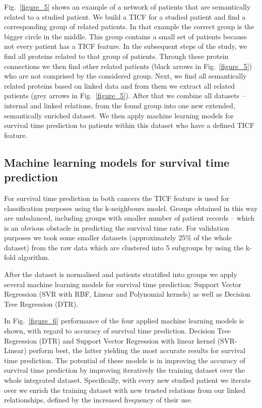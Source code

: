 \documentclass{bmcart}
\begin{document}
Fig.~\ref{figure_5} shows an example of a network of patients that are
semantically related to a studied patient. We build a TICF for a
studied patient and find a corresponding group of related patients. In
that example the correct group is the bigger circle in the middle. This
group contains a small set of patients because not every patient has a
TICF feature. In the subsequent steps of the study, we find all
proteins related to that group of patients. Through these protein
connections we then find other related patients (black arrows in Fig.~\ref{figure_5}) who are not comprised by the considered group. Next, we find all
semantically related proteins based on linked data and from them we
extract all related patients (grey arrows in Fig.~\ref{figure_5}). After that we
combine all datasets -- internal and linked relations, from the found
group into one new extended, semantically enriched dataset. We then
apply machine learning models for survival time prediction to patients
within this dataset who have a defined TICF feature.

\subsection{Machine learning models for survival time prediction}

For survival time prediction in both cancers the TICF feature is used
for classification purposes using the k-neighbours model. Groups
obtained in this way are unbalanced, including groups with smaller
number of patient records -- which is an obvious obstacle in predicting
the survival time rate. For validation purposes we took some smaller
datasets (approximately 25\% of the whole dataset) from the raw data which are clustered into 5 subgroups by
using the k-fold algorithm.

After the dataset is normalised and patients stratified into groups we
apply several machine learning models for survival time prediction:
Support Vector Regression (SVR with RBF, Linear and Polynomial kernels) as
well as Decision Tree Regression (DTR).






In Fig.~\ref{figure_6} performance of the four applied machine learning models is
shown, with regard to accuracy of survival time prediction. Decision
Tree Regression (DTR) and Support Vector Regression with linear kernel
(SVR-Linear) perform best, the latter yielding the most accurate
results for survival time prediction. The potential of these models is
in improving the accuracy of survival time prediction by improving
iteratively the training dataset over the whole integrated dataset.
Specifically, with every new studied patient we iterate over we enrich
the training dataset with new trusted relations from our linked
relationships, defined by the increased frequency of their use. 
\end{document}
